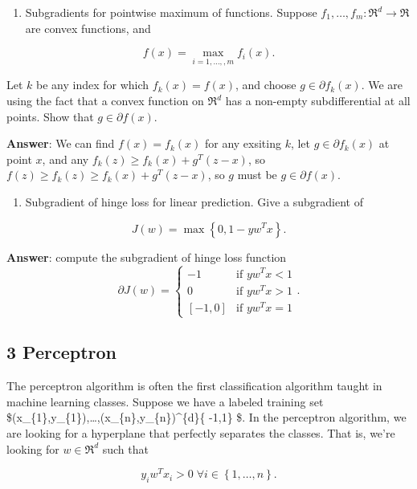 \documentclass[11pt]{article}
\providecommand{\tightlist}{%
      \setlength{\itemsep}{0pt}\setlength{\parskip}{0pt}}
\begin{document}
    \begin{enumerate}
\def\labelenumi{\arabic{enumi}.}
\tightlist
\item
  Subgradients for pointwise maximum of functions. Suppose
  \(f_{1},\ldots,f_{m}:\Re^{d}\to\Re\) are convex functions, and
\end{enumerate}

\[
f(x)=\max_{i=1,\ldots,,m}f_{i}(x).
\]

Let \(k\) be any index for which \(f_{k}(x)=f(x)\), and choose
\(g\in\partial f_{k}(x)\). We are using the fact that a convex function
on \(\Re^{d}\) has a non-empty subdifferential at all points. Show that
\(g\in\partial f(x)\).

    \textbf{Answer}: We can find \(f(x) = f_{k}(x)\) for any exsiting \(k\),
let \(g\in\partial f_{k}(x)\) at point \(x\), and any
\(f_k(z)\ge f_k(x)+g^{T}(z-x)\), so
\(f(z) \ge f_k(z) \ge f_k(x)+g^{T}(z-x)\), so \(g\) must be
\(g\in\partial f(x)\).

    \begin{enumerate}
\def\labelenumi{\arabic{enumi}.}
\setcounter{enumi}{1}
\tightlist
\item
  Subgradient of hinge loss for linear prediction. Give a subgradient of
\end{enumerate}

\[
J(w)=\max\left\{ 0,1-yw^{T}x\right\} .
\]

    \textbf{Answer}: compute the subgradient of hinge loss function \[
\partial J(w)= 
\begin{cases}
  -1 & \text{if $yw^{T}x < 1$} \\
  0 & \text{if $yw^{T}x > 1$} \\
  [-1,0] & \text{if $yw^{T}x = 1$}
\end{cases}.
\]

    \hypertarget{perceptron}{%
\subsection{3 Perceptron}\label{perceptron}}

The perceptron algorithm is often the first classification algorithm
taught in machine learning classes. Suppose we have a labeled training
set
\$\left(x\_\{1\},y\_\{1\}\right),\ldots,(x\_\{n\},y\_\{n\})\in\Re\^{}\{d\}\times\left\{
-1,1\right\} \$. In the perceptron algorithm, we are looking for a
hyperplane that perfectly separates the classes. That is, we're looking
for \(w\in\Re^{d}\) such that

\[
y_{i}w^{T}x_{i}>0\;\forall i\in\left\{ 1,\ldots,n\right\} .
\]
\end{document}
